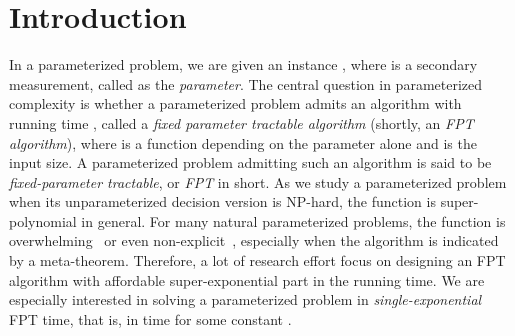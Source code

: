 \documentclass[11pt]{article}
\theoremstyle{remark}
\newcommand{\LRWD}{\textsc{LRW1-Vertex Deletion} }
\begin{document}
\begin{abstract}
\emph{Linear rankwidth} is a linearized variant of rankwidth, introduced by Oum and Seymour [Approximating clique-width and branch-width. , 96(4):514--528, 2006]. Motivated from recent development on graph modification problems regarding classes of graphs of bounded treewidth or pathwidth, we study the {\sc Linear Rankwidth- Vertex Deletion} problem (shortly, {\sc LRW1-Vertex Deletion}). In the {\sc LRW1-Vertex Deletion} problem, given an -vertex graph  and a positive integer , we want to decide whether there is a set of at most  vertices whose removal turns  into a graph of linear rankwidth at most  and find such a vertex set if one exists. While the meta-theorem of Courcelle, Makowsky, and Rotics implies that \LRWD  can be solved in time  for some function ,  it is not clear whether this problem allows a running time with a modest exponential function. 

We first establish that \LRWD  can be solved in time . The major obstacle to this end is how to handle a long induced cycle as an obstruction. To fix this issue, we define \emph{necklace graphs} and investigate their structural properties. Later, we reduce the polynomial factor by refining the trivial branching step based on a cliquewidth expression of a graph, and obtain an algorithm that runs in time . We also prove that the running time cannot be improved to  under the Exponential Time Hypothesis assumption. Lastly, we show that the \LRWD problem admits  a polynomial kernel.
\end{abstract}

\section{Introduction}


In a parameterized problem, we are given an instance , where  is a secondary measurement, called as the \emph{parameter}. 
The central question in parameterized complexity is whether a parameterized problem admits an algorithm with running time , called a \emph{fixed parameter tractable algorithm} (shortly, an \emph{FPT algorithm}),
where  is a function depending on the parameter  alone and  is the input size.
A parameterized problem admitting such an algorithm is said to be \emph{fixed-parameter tractable}, or {\em FPT} in short. 
As we study a parameterized problem when its unparameterized decision version is NP-hard, the function  is super-polynomial in general. 
For many natural parameterized problems, the function  is overwhelming~\cite{FG04} or even non-explicit~\cite{RS2004}, especially when the algorithm is indicated by a meta-theorem. Therefore, a lot of research effort focus  on designing an FPT algorithm with affordable super-exponential part in the running time. We are especially interested in solving a parameterized problem in {\em single-exponential} FPT time, that is, in time  for some constant .
\end{document}
